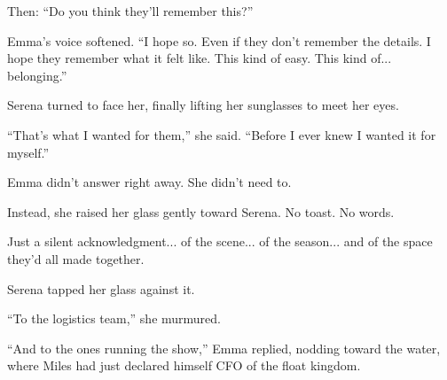 Then: ``Do you think they’ll remember this?''

Emma’s voice softened. ``I hope so. Even if they don’t remember the details. I hope they remember what it 
felt like. This kind of easy. This kind of... belonging.''

Serena turned to face her, finally lifting her sunglasses to meet her eyes.

``That’s what I wanted for them,'' she said. ``Before I ever knew I wanted it for myself.''

Emma didn’t answer right away. She didn’t need to.

Instead, she raised her glass gently toward Serena.  
No toast. No words.

Just a silent acknowledgment... of the scene... of the season... and of the space they’d all made together.

Serena tapped her glass against it.

``To the logistics team,'' she murmured.

``And to the ones running the show,'' Emma replied, nodding toward the water, where Miles had just declared 
himself CFO of the float kingdom.